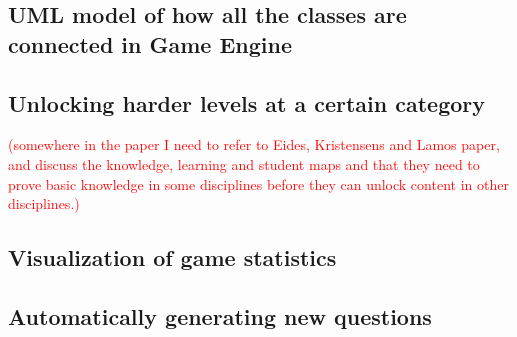 \subsection{UML model of how all the classes are connected in Game Engine}

\subsection{Unlocking harder levels at a certain category}
\textcolor{red}{(somewhere in the paper I need to refer to Eides, Kristensens and Lamos paper, and discuss the knowledge, learning and student maps and that they need to prove basic knowledge in some disciplines before they can unlock content in other disciplines.)}
\subsection{Visualization of game statistics}
\subsection{Automatically generating new questions}
